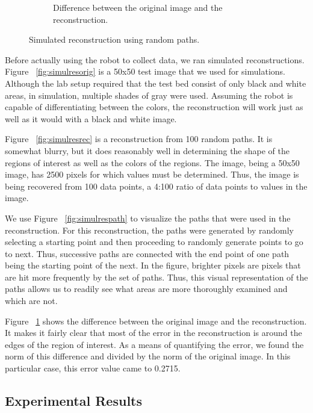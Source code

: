 \documentclass[english]{article}\usepackage[]{graphicx}\usepackage[]{color}
\begin{document}
\begin{figure}[h]
\begin{subfigure}{.22\textwidth}
  \caption{Difference between the original image and the reconstruction.}
  \vspace{0pt}
  \label{fig:simulreserr}
\end{subfigure}
\caption{Simulated reconstruction using random paths.}
\label{fig:simulres}
\end{figure}

Before actually using the robot to collect data, we ran simulated reconstructions. Figure ~\ref{fig:simulresorig} is a 50x50 test image that we used for simulations. Although the lab setup required that the test bed consist of only black and white areas, in simulation, multiple shades of gray were used. Assuming the robot is capable of differentiating between the colors, the reconstruction will work just as well as it would with a black and white image.

Figure ~\ref{fig:simulresrec} is a reconstruction from 100 random paths. It is somewhat blurry, but it does reasonably well in determining the shape of the regions of interest as well as the colors of the regions. The image, being a 50x50 image, has 2500 pixels for which values must be determined. Thus, the image is being recovered from 100 data points, a 4:100 ratio of data points to values in the image.

We use Figure ~\ref{fig:simulrespath} to visualize the paths that were used in the reconstruction. For this reconstruction, the paths were generated by randomly selecting a starting point and then proceeding to randomly generate points to go to next. Thus, successive paths are connected with the end point of one path being the starting point of the next. In the figure, brighter pixels are pixels that are hit more frequently by the set of paths. Thus, this visual representation of the paths allows us to readily see what areas are more thoroughly examined and which are not.

Figure ~\ref{fig:simulreserr} shows the difference between the original image and the reconstruction. It makes it fairly clear that most of the error in the reconstruction is around the edges of the region of interest. As a means of quantifying the error, we found the norm of this difference and divided by the norm of the original image. In this particular case, this error value came to 0.2715.



\subsection{Experimental Results}
\end{document}
